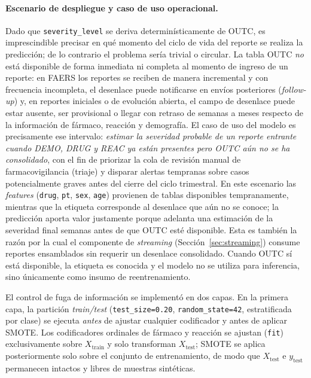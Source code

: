 \documentclass[12pt,a4paper]{article}
\begin{document}
\paragraph{Escenario de despliegue y caso de uso operacional.} Dado que \texttt{severity\_level} se deriva determinísticamente de OUTC, es imprescindible precisar en qué momento del ciclo de vida del reporte se realiza la predicción; de lo contrario el problema sería trivial o circular. La tabla OUTC \textit{no} está disponible de forma inmediata ni completa al momento de ingreso de un reporte: en FAERS los reportes se reciben de manera incremental y con frecuencia incompleta, el desenlace puede notificarse en envíos posteriores (\textit{follow-up}) y, en reportes iniciales o de evolución abierta, el campo de desenlace puede estar ausente, ser provisional o llegar con retraso de semanas a meses respecto de la información de fármaco, reacción y demografía. El caso de uso del modelo es precisamente ese intervalo: \textit{estimar la severidad probable de un reporte entrante cuando DEMO, DRUG y REAC ya están presentes pero OUTC aún no se ha consolidado}, con el fin de priorizar la cola de revisión manual de farmacovigilancia (triaje) y disparar alertas tempranas sobre casos potencialmente graves antes del cierre del ciclo trimestral. En este escenario las \textit{features} (\texttt{drug}, \texttt{pt}, \texttt{sex}, \texttt{age}) provienen de tablas disponibles tempranamente, mientras que la etiqueta corresponde al desenlace que aún no se conoce; la predicción aporta valor justamente porque adelanta una estimación de la severidad final semanas antes de que OUTC esté disponible. Esta es también la razón por la cual el componente de \textit{streaming} (Sección~\ref{sec:streaming}) consume reportes ensamblados sin requerir un desenlace consolidado. Cuando OUTC sí está disponible, la etiqueta es conocida y el modelo no se utiliza para inferencia, sino únicamente como insumo de reentrenamiento.

El control de fuga de información se implementó en dos capas. En la primera capa, la partición \textit{train/test} (\texttt{test\_size=0.20}, \texttt{random\_state=42}, estratificada por clase) se ejecuta \textit{antes} de ajustar cualquier codificador y antes de aplicar SMOTE. Los codificadores ordinales de fármaco y reacción se ajustan (\texttt{fit}) exclusivamente sobre \(X_{\text{train}}\) y solo transforman \(X_{\text{test}}\); SMOTE se aplica posteriormente solo sobre el conjunto de entrenamiento, de modo que \(X_{\text{test}}\) e \(y_{\text{test}}\) permanecen intactos y libres de muestras sintéticas.
\end{document}
